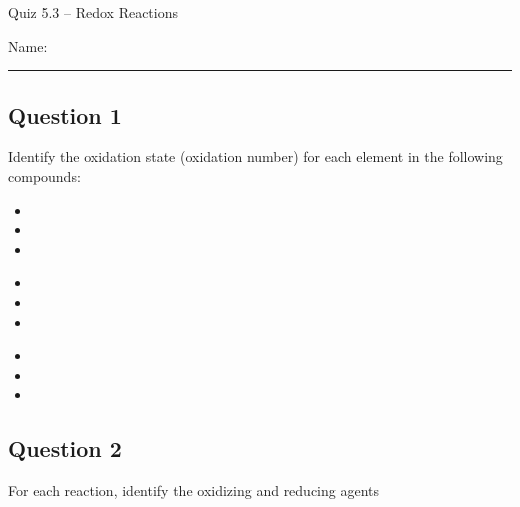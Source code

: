\documentclass[11pt, letterpaper]{memoir}
\begin{document}
	\begin{center}
		{\large Quiz 5.3 --	Redox Reactions}
	\end{center}
	{\large Name: \rule[-1mm]{4in}{.1pt} 

\subsection*{Question 1}
Identify the oxidation state (oxidation number) for each element in the following compounds:

\vspace{1em}
\noindent\begin{minipage}{0.33\linewidth}
	\begin{itemize}
		\item {}
		
		\vspace{3em}
		\item {}
		
		\vspace{3em}
		\item {}
	\end{itemize}
\end{minipage}
\begin{minipage}{0.33\linewidth}
	\begin{itemize}
		\item {}
	
		\vspace{3em}
		\item {}
		
		\vspace{3em}
		\item {}
	\end{itemize}
\end{minipage}
\begin{minipage}{0.33\linewidth}
	\begin{itemize}
		\item {}
		
		\vspace{3em}
		\item {}
		
		\vspace{3em}
		\item {}
	\end{itemize}
\end{minipage}

\vspace{3em}
\subsection*{Question 2}
For each reaction, identify the oxidizing and reducing agents

}
\end{document}
